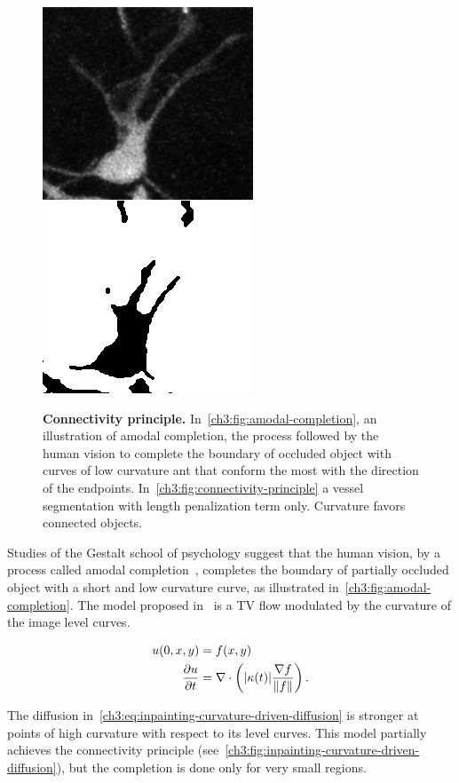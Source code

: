 \begin{figure}
{\includegraphics[scale=0.45]{figures/chapter3/vessels-bad-seg.png}
}
\caption{\textbf{Connectivity principle.} In~\cref{ch3:fig:amodal-completion}, an illustration of amodal completion, the process followed by the human vision to complete the boundary of occluded object with curves of low curvature ant that conform the most with the direction of the endpoints. In~\cref{ch3:fig:connectivity-principle} a vessel segmentation with length penalization term only. Curvature favors connected objects.}
\end{figure}

Studies of the Gestalt school of psychology suggest that the human vision, by a process called amodal completion~\cite{mumford94elastica}, completes the boundary of partially occluded object with a short and low curvature curve, as illustrated in~\cref{ch3:fig:amodal-completion}. The model proposed in~\cite{chan01nontexture} is a TV flow modulated by the curvature of the image level curves. 

\begin{align}
	u(0,x,y) &= f(x,y) \nonumber \\
	\frac{\partial u}{\partial t} &= \nabla \cdot \left( |\kappa(t)|\frac{\nabla f}{\lVert f\rVert} \right) .
	\label{ch3:eq:inpainting-curvature-driven-diffusion}
\end{align}

The diffusion in~\cref{ch3:eq:inpainting-curvature-driven-diffusion} is stronger at points of high curvature with respect to its level curves. This model partially achieves the connectivity principle (see~\cref{ch3:fig:inpainting-curvature-driven-diffusion}), but the completion is done only for very small regions. 

